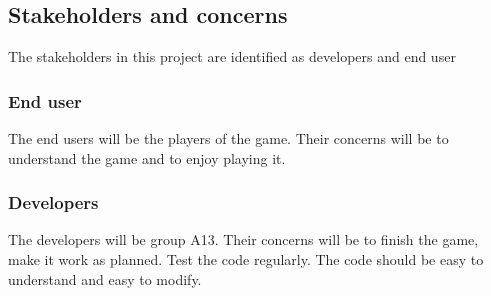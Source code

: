 \subsection{Stakeholders and concerns}

The stakeholders in this project are identified as developers and end user

\subsubsection{End user}

The end users will be the players of the game. Their concerns will be to understand the game and to enjoy playing it.

\subsubsection{Developers}

The developers will be group A13. Their concerns will be to finish the game, make it work as planned. Test the code regularly. The code should be easy to understand and easy to modify.  